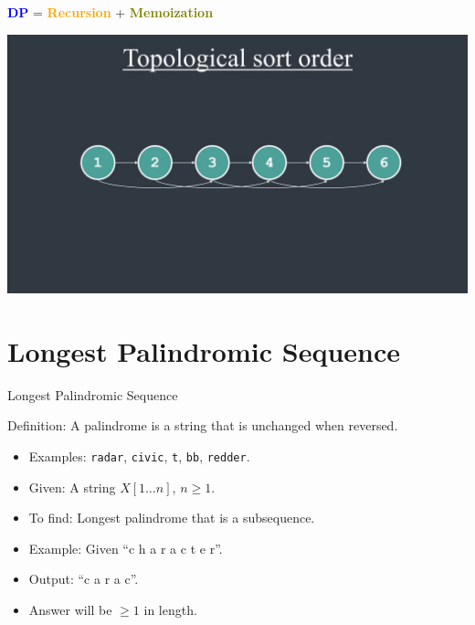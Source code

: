 \documentclass{beamer}
\begin{document}
\begin{frame}{ }
    \centering
    \LARGE
    \textcolor{blue}{\textbf{DP}} = \textcolor{orange}{\textbf{Recursion}} + \textcolor{olive}{\textbf{Memoization}}
\end{frame}


\begin{frame}{ }
    \centering
    \includegraphics[width=\textwidth]{figures/topo.png}
\end{frame}

\section{Longest Palindromic Sequence}

\begin{frame}{Longest Palindromic Sequence}
    \begin{exampleblock}{Definition:}
        A palindrome is a string that is unchanged when reversed.
    \end{exampleblock}
    \begin{itemize}
     \item Examples: \texttt{radar}, \texttt{civic}, \texttt{t}, \texttt{bb}, \texttt{redder}.
     \item Given: A string $X[1 \ldots n]$, $n \geq 1$.
     \item To ﬁnd: Longest palindrome that is a subsequence.
     \item Example: Given ``c h a r a c t e r''.
     \item Output: ``c a r a c''.
     \item Answer will be $\geq 1$ in length.
    \end{itemize}
\end{frame}
\end{document}
